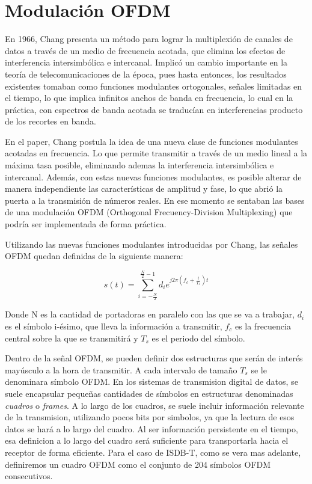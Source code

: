 \section{Modulación OFDM}

En 1966, Chang presenta un método para lograr la multiplexión de canales de datos a través de un medio de frecuencia acotada, que elimina los efectos de interferencia intersimbólica e intercanal\cite{chang-ofdm}. Implicó un cambio importante en la teoría de telecomunicaciones de la época, pues hasta entonces, los resultados existentes tomaban como funciones modulantes ortogonales, señales limitadas en el tiempo, lo que implica infinitos anchos de banda en frecuencia, lo cual en la práctica, con espectros de banda acotada se traducían en interferencias producto de los recortes en banda. 

En el paper, Chang postula la idea de una nueva clase de funciones modulantes acotadas en frecuencia. Lo que permite transmitir a través de un medio lineal a la máxima tasa posible, eliminando ademas la interferencia intersimbólica e intercanal. Además, con estas nuevas funciones modulantes, es posible alterar de manera independiente las características de amplitud y fase, lo que abrió la puerta a la transmisión de números reales. En ese momento se sentaban las bases de una modulación OFDM (Orthogonal Frecuency-Division Multiplexing) que podría ser implementada de forma práctica.

Utilizando las nuevas funciones modulantes introducidas por Chang, las señales OFDM quedan definidas de la siguiente manera:

\begin{equation}
s(t) = \sum_{i=-\frac{N}{2}}^{\frac{N}{2} - 1} d_{i} e^{j2\pi(f_c + \frac{i}{T_s})t}
\end{equation}

Donde N es la cantidad de portadoras en paralelo con las que se va a trabajar, $d_i$ es el símbolo i-ésimo, que lleva la información a transmitir, $f_c$ es la frecuencia central sobre la que se transmitirá y $T_s$ es el periodo del símbolo. 

Dentro de la señal OFDM, se pueden definir dos estructuras que serán de interés mayúsculo a la hora de transmitir. A cada intervalo de tamaño $T_s$ se le denominara símbolo OFDM. En los sistemas de transmision digital de datos, se suele encapsular pequeñas cantidades de símbolos en estructuras denominadas \textit{cuadros} o \textit{frames}. A lo largo de los cuadros, se suele incluir información relevante de la transmision, utilizando pocos bits por simbolos, ya que la lectura de esos datos se hará a lo largo del cuadro. Al ser información persistente en el tiempo, esa definicion a lo largo del cuadro será suficiente para transportarla hacia el receptor de forma eficiente. Para el caso de ISDB-T, como se vera mas adelante, definiremos un cuadro OFDM como el conjunto de 204 símbolos OFDM consecutivos.

